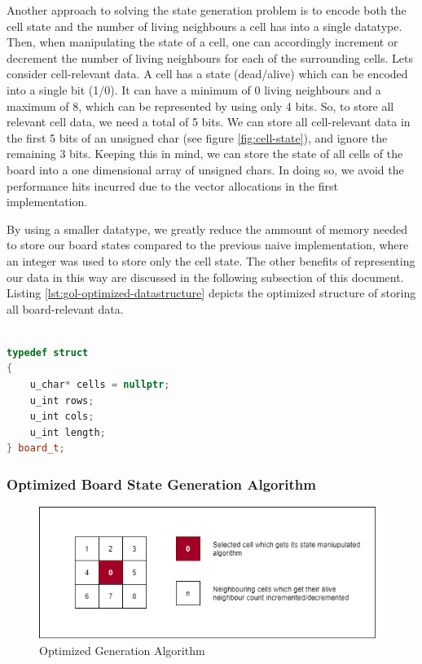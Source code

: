 \documentclass[a4paper,english,12pt,twoside=false]{scrartcl} %
\begin{document}
Another approach to solving the state generation problem is to encode both the cell state and the number of living neighbours a cell has into a single datatype. Then, when manipulating the state of a cell, one can accordingly increment or decrement the number of living neighbours for each of the surrounding cells. Lets consider cell-relevant data. A cell has a state (dead/alive) which can be encoded into a single bit (1/0). It can have a minimum of 0 living neighbours and a maximum of 8, which can be represented by using only 4 bits. So, to store all relevant cell data, we need a total of 5 bits. We can store all cell-relevant data in the first 5 bits of an unsigned char (see figure \ref{fig:cell-state}), and ignore the remaining 3 bits. Keeping this in mind, we can store the state of all cells of the board into a one dimensional array of unsigned chars. In doing so, we avoid the performance hits incurred due to the vector allocations in the first implementation.

By using a smaller datatype, we greatly reduce the ammount of memory needed to store our board states compared to the previous naive implementation, where an integer was used to store only the cell state. The other benefits of representing our data in this way are discussed in the following subsection of this document. Listing \ref{lst:gol-optimized-datastructure} depicts the optimized structure of storing all board-relevant data.

\begin{lstlisting}[caption={Parallel Naive State Generation Algorithm},label={lst:gol-optimized-datastructure},language=C++]

typedef struct
{
    u_char* cells = nullptr;
    u_int rows;
    u_int cols;
    u_int length;
} board_t;

\end{lstlisting}

\subsubsection{Optimized Board State Generation Algorithm}

\begin{figure}[tbh!]
	\centering
	\includegraphics[width=16cm]{imgs/cell-algo.png}
	\caption{Optimized Generation Algorithm}
	\label{fig:cell-algo}
\end{figure}
\end{document}
